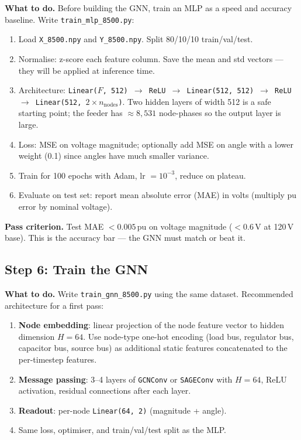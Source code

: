 \documentclass[11pt]{article}
\begin{document}
\noindent\textbf{What to do.}
Before building the GNN, train an MLP as a speed and accuracy baseline.
Write \texttt{train\_mlp\_8500.py}:

\begin{enumerate}[itemsep=2pt]
  \item Load \texttt{X\_8500.npy} and \texttt{Y\_8500.npy}.  Split 80/10/10
    train/val/test.
  \item Normalise: z-score each feature column.  Save the mean and std
    vectors --- they will be applied at inference time.
  \item Architecture: \texttt{Linear($F$, 512) $\to$ ReLU $\to$
    Linear(512, 512) $\to$ ReLU $\to$ Linear(512, $2 \times n_{\text{nodes}}$)}.
    Two hidden layers of width 512 is a safe starting point; the feeder has
    ${\approx}8{,}531$ node-phases so the output layer is large.
  \item Loss: MSE on voltage magnitude; optionally add MSE on angle with a
    lower weight (0.1) since angles have much smaller variance.
  \item Train for 100 epochs with Adam, lr $= 10^{-3}$, reduce on plateau.
  \item Evaluate on test set: report mean absolute error (MAE) in volts
    (multiply pu error by nominal voltage).
\end{enumerate}

\noindent\textbf{Pass criterion.}
Test MAE $< 0.005$\,pu on voltage magnitude ($< 0.6$\,V at 120\,V base).
This is the accuracy bar --- the GNN must match or beat it.

\subsection{Step 6: Train the GNN}
\label{subsec:step6}

\noindent\textbf{What to do.}
Write \texttt{train\_gnn\_8500.py} using the same dataset.  Recommended
architecture for a first pass:

\begin{enumerate}[itemsep=2pt]
  \item \textbf{Node embedding}: linear projection of the node feature vector
    to hidden dimension $H = 64$.  Use node-type one-hot encoding (load bus,
    regulator bus, capacitor bus, source bus) as additional static features
    concatenated to the per-timestep features.
  \item \textbf{Message passing}: 3--4 layers of
    \texttt{GCNConv} or \texttt{SAGEConv} with $H=64$, ReLU activation,
    residual connections after each layer.
  \item \textbf{Readout}: per-node \texttt{Linear(64, 2)} (magnitude + angle).
  \item Same loss, optimiser, and train/val/test split as the MLP.
\end{enumerate}
\end{document}
